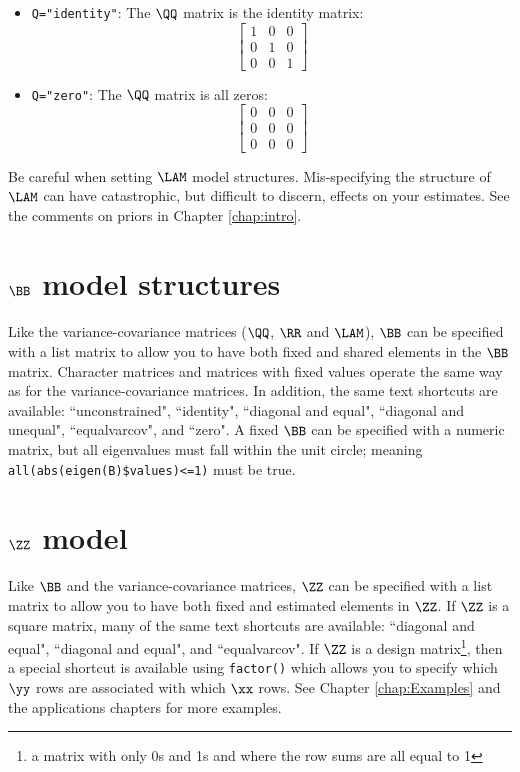\begin{itemize}
\item[] \texttt{Q="identity"}: The $\QQ$ matrix is the identity matrix:
\begin{equation*}
 \left[ \begin{array}{ccc}
    1 & 0 & 0\\
    0 & 1 & 0 \\
    0 & 0 & 1 \end{array} \right]
\end{equation*}

\item[] \texttt{Q="zero"}: The $\QQ$ matrix is all zeros:
\begin{equation*}
 \left[ \begin{array}{ccc}
    0 & 0 & 0\\
    0 & 0 & 0 \\
    0 & 0 & 0 \end{array} \right]
\end{equation*}
\end{itemize}

Be careful when setting $\LAM$ model structures.  Mis-specifying the structure of $\LAM$ can have catastrophic, but difficult to discern, effects on your estimates.  See the comments on priors in Chapter \ref{chap:intro}.

\section{$\BB$ model structures}

Like the variance-covariance matrices ($\QQ$, $\RR$ and $\LAM$), $\BB$ can be specified with a list matrix to allow you to have both fixed and shared elements in the $\BB$ matrix.  Character matrices and matrices with fixed values operate the same way as for the variance-covariance matrices.  In addition, the same text shortcuts are available: ``unconstrained", ``identity", ``diagonal and equal", ``diagonal and unequal", ``equalvarcov", and ``zero".  A fixed $\BB$ can be specified with a numeric matrix, but  all eigenvalues must fall within the unit circle; meaning \texttt{all(abs(eigen(B)\$values)<=1)} must be true.  

\section{$\ZZ$ model}

Like $\BB$ and the variance-covariance matrices, $\ZZ$ can be specified with a list matrix to allow you to have both fixed and estimated elements in $\ZZ$. If $\ZZ$ is a square matrix, many of the same text shortcuts are available: ``diagonal and equal", ``diagonal and equal", and ``equalvarcov".  If $\ZZ$ is a design matrix\footnote{a matrix with only 0s and 1s and where the row sums are all equal to 1}, then a special shortcut is available using \texttt{factor()} which allows you to specify which $\yy$ rows are associated with which $\xx$ rows.  See Chapter \ref{chap:Examples} and the applications chapters for more examples.

